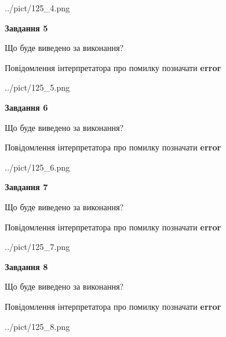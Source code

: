 \documentclass[12pt, ukrainian]{article}
\begin{document}
{\begin{center}
	{../pict/125_4.png}
\end{center}
\newpage

{\begin {center}\textbf{Завдання 5}\end {center}}\par
Що буде виведено за виконання? \par
Повідомлення інтерпретатора про помилку позначати \textbf{error}

\begin{center}
	{../pict/125_5.png}
\end{center}
\newpage

{\begin {center}\textbf{Завдання 6}\end {center}}\par
Що буде виведено за виконання? \par
Повідомлення інтерпретатора про помилку позначати \textbf{error}

\begin{center}
	{../pict/125_6.png}
\end{center}
\newpage

{\begin {center}\textbf{Завдання 7}\end {center}}\par
Що буде виведено за виконання? \par
Повідомлення інтерпретатора про помилку позначати \textbf{error}

\begin{center}
	{../pict/125_7.png}
\end{center}
\newpage

{\begin {center}\textbf{Завдання 8}\end {center}}\par
Що буде виведено за виконання? \par
Повідомлення інтерпретатора про помилку позначати \textbf{error}

\begin{center}
	{../pict/125_8.png}
\end{center}
\newpage

}
\end{document}
